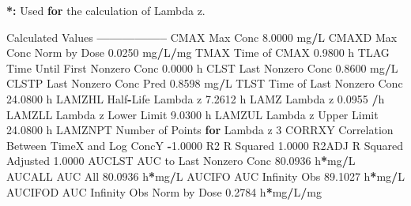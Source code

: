 \documentclass[12pt,]{krantz}
\newenvironment{Shaded}{\begin{snugshade}}{\end{snugshade}}
\newcommand{\DecValTok}[1]{\textcolor[rgb]{0.00,0.00,0.81}{#1}}
\newcommand{\FloatTok}[1]{\textcolor[rgb]{0.00,0.00,0.81}{#1}}
\newcommand{\StringTok}[1]{\textcolor[rgb]{0.31,0.60,0.02}{#1}}
\newcommand{\ControlFlowTok}[1]{\textcolor[rgb]{0.13,0.29,0.53}{\textbf{#1}}}
\newcommand{\OperatorTok}[1]{\textcolor[rgb]{0.81,0.36,0.00}{\textbf{#1}}}
\newcommand{\ErrorTok}[1]{\textcolor[rgb]{0.64,0.00,0.00}{\textbf{#1}}}
\newcommand{\NormalTok}[1]{#1}
\theoremstyle{definition}
\theoremstyle{definition}
\theoremstyle{definition}
\theoremstyle{remark}
\begin{document}
\begin{Shaded}
\begin{Highlighting}[]
{{{{{{{{{{{{\OperatorTok{*}\ErrorTok{:}\StringTok{ }\NormalTok{Used }\ControlFlowTok{for}\NormalTok{ the calculation of Lambda z.}


\NormalTok{Calculated Values}
\OperatorTok{-----------------}
\NormalTok{CMAX       Max Conc                                        }\FloatTok{8.0000}\NormalTok{ mg}\OperatorTok{/}\NormalTok{L}
\NormalTok{CMAXD      Max Conc Norm by Dose                           }\FloatTok{0.0250}\NormalTok{ mg}\OperatorTok{/}\NormalTok{L}\OperatorTok{/}\NormalTok{mg}
\NormalTok{TMAX       Time of CMAX                                    }\FloatTok{0.9800}\NormalTok{ h}
\NormalTok{TLAG       Time Until First Nonzero Conc                   }\FloatTok{0.0000}\NormalTok{ h}
\NormalTok{CLST       Last Nonzero Conc                               }\FloatTok{0.8600}\NormalTok{ mg}\OperatorTok{/}\NormalTok{L}
\NormalTok{CLSTP      Last Nonzero Conc Pred                          }\FloatTok{0.8598}\NormalTok{ mg}\OperatorTok{/}\NormalTok{L}
\NormalTok{TLST       Time of Last Nonzero Conc                      }\FloatTok{24.0800}\NormalTok{ h}
\NormalTok{LAMZHL     Half}\OperatorTok{-}\NormalTok{Life Lambda z                              }\FloatTok{7.2612}\NormalTok{ h}
\NormalTok{LAMZ       Lambda z                                        }\FloatTok{0.0955} \OperatorTok{/}\NormalTok{h}
\NormalTok{LAMZLL     Lambda z Lower Limit                            }\FloatTok{9.0300}\NormalTok{ h}
\NormalTok{LAMZUL     Lambda z Upper Limit                           }\FloatTok{24.0800}\NormalTok{ h}
\NormalTok{LAMZNPT    Number of Points }\ControlFlowTok{for}\NormalTok{ Lambda z                   }\DecValTok{3}
\NormalTok{CORRXY     Correlation Between TimeX and Log ConcY        }\OperatorTok{-}\FloatTok{1.0000} 
\NormalTok{R2         R Squared                                       }\FloatTok{1.0000} 
\NormalTok{R2ADJ      R Squared Adjusted                              }\FloatTok{1.0000} 
\NormalTok{AUCLST     AUC to Last Nonzero Conc                       }\FloatTok{80.0936}\NormalTok{ h}\OperatorTok{*}\NormalTok{mg}\OperatorTok{/}\NormalTok{L}
\NormalTok{AUCALL     AUC All                                        }\FloatTok{80.0936}\NormalTok{ h}\OperatorTok{*}\NormalTok{mg}\OperatorTok{/}\NormalTok{L}
\NormalTok{AUCIFO     AUC Infinity Obs                               }\FloatTok{89.1027}\NormalTok{ h}\OperatorTok{*}\NormalTok{mg}\OperatorTok{/}\NormalTok{L}
\NormalTok{AUCIFOD    AUC Infinity Obs Norm by Dose                   }\FloatTok{0.2784}\NormalTok{ h}\OperatorTok{*}\NormalTok{mg}\OperatorTok{/}\NormalTok{L}\OperatorTok{/}\NormalTok{mg}
}}}}}}}}}}}}
\end{Highlighting}
\end{Shaded}
\end{document}
